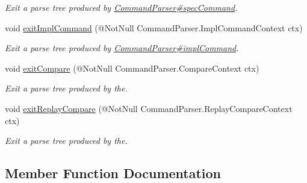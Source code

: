\begin{DoxyCompactItemize}
\begin{DoxyCompactList}\small\item\em Exit a parse tree produced by \hyperlink{}{Command\+Parser\#spec\+Command}. \end{DoxyCompactList}\item 
void \hyperlink{classedu_1_1udel_1_1cis_1_1vsl_1_1civl_1_1run_1_1common_1_1CIVLCommandListener_a8b82381c1f3f0f8a58efcad37bc20e6b}{exit\+Impl\+Command} (@Not\+Null Command\+Parser.\+Impl\+Command\+Context ctx)
\begin{DoxyCompactList}\small\item\em Exit a parse tree produced by \hyperlink{}{Command\+Parser\#impl\+Command}. \end{DoxyCompactList}\item 
void \hyperlink{classedu_1_1udel_1_1cis_1_1vsl_1_1civl_1_1run_1_1common_1_1CIVLCommandListener_a4f4386c389fb63cb1ced074ceebf9ac7}{exit\+Compare} (@Not\+Null Command\+Parser.\+Compare\+Context ctx)
\begin{DoxyCompactList}\small\item\em Exit a parse tree produced by the. \end{DoxyCompactList}\item 
void \hyperlink{classedu_1_1udel_1_1cis_1_1vsl_1_1civl_1_1run_1_1common_1_1CIVLCommandListener_a1edf99fb2667bd26731131d65c41a2e3}{exit\+Replay\+Compare} (@Not\+Null Command\+Parser.\+Replay\+Compare\+Context ctx)
\begin{DoxyCompactList}\small\item\em Exit a parse tree produced by the. \end{DoxyCompactList}\end{DoxyCompactItemize}


\subsection{Member Function Documentation}
\hypertarget{classedu_1_1udel_1_1cis_1_1vsl_1_1civl_1_1run_1_1common_1_1CIVLCommandListener_ac9f79606e749b49a41f30bde571e1044}{}
